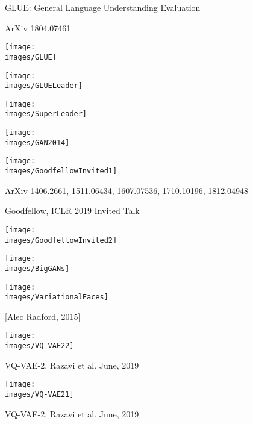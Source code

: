 {GLUE: General Language Understanding Evaluation

\vfill

\centerline{\normalsize ArXiv 1804.07461}
\centerline{\texttt{[image: \\images/GLUE]}}


\centerline{\texttt{[image: \\images/GLUELeader]}}


\centerline{\texttt{[image: \\images/SuperLeader]}}

\centerline{\texttt{[image: \\images/GAN2014]}}


\centerline{\texttt{[image: \\images/GoodfellowInvited1]}}

ArXiv 1406.2661, 1511.06434, 1607.07536, 1710.10196, 1812.04948

\centerline{Goodfellow, ICLR 2019 Invited Talk}


\centerline{\texttt{[image: \\images/GoodfellowInvited2]}}


\centerline{\texttt{[image: \\images/BigGANs]}}


\centerline{\texttt{[image: \\images/VariationalFaces]}}
\centerline{[Alec Radford, 2015]}


\centerline{\texttt{[image: \\images/VQ-VAE22]}}

\vfill
VQ-VAE-2, Razavi et al. June, 2019


\centerline{\texttt{[image: \\images/VQ-VAE21]}}

\vfill
VQ-VAE-2, Razavi et al. June, 2019


}

